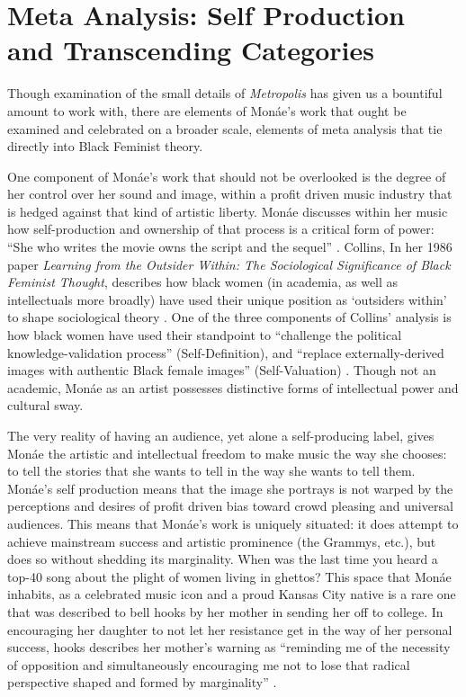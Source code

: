 \documentclass[a4paper, 11pt]{article} %
\begin{document}


\section*{Meta Analysis: Self Production and Transcending Categories}

Though examination of the small details of \emph{Metropolis} has given us a bountiful amount to work with, there are elements of Mon\'ae's work that ought be examined and celebrated on a broader scale, elements of meta analysis that tie directly into Black Feminist theory.

One component of Mon\'ae's work that should not be overlooked is the degree of her control over her sound and image, within a profit driven music industry that is hedged against that kind of artistic liberty.
Mon\'ae discusses within her music how self-production and ownership of that process is a critical form of power: 
``She who writes the movie owns the script and the sequel'' .
Collins, In her 1986 paper \emph{Learning from the Outsider Within: The Sociological Significance of Black Feminist Thought}, describes how black women (in academia, as well as intellectuals more broadly) have used their unique position as `outsiders within' to shape sociological theory .
One of the three components of Collins' analysis is how black women have used their standpoint to ``challenge the political knowledge-validation process'' (Self-Definition), and ``replace externally-derived images with authentic Black female images'' (Self-Valuation) .
Though not an academic, Mon\'ae as an artist possesses distinctive forms of intellectual power and cultural sway.

The very reality of having an audience, yet alone a self-producing label, gives Mon\'ae the artistic and intellectual freedom to make music the way she chooses: to tell the stories that she wants to tell in the way she wants to tell them.
Mon\'ae's self production means that the image she portrays is not warped by the perceptions and desires of profit driven bias toward crowd pleasing and universal audiences.
This means that Mon\'ae's work is uniquely situated: it does attempt to achieve mainstream success and artistic prominence (the Grammys, etc.), but does so without shedding its marginality.
When was the last time you heard a top-40 song about the plight of women living in ghettos?
This space that Mon\'ae inhabits, as a celebrated music icon and a proud Kansas City native is a rare one that was described to bell hooks by her mother in sending her off to college.
In encouraging her daughter to not let her resistance get in the way of her personal success, hooks describes her mother's warning as ``reminding me of the necessity of opposition and simultaneously encouraging me not to lose that radical perspective shaped and formed by marginality'' .
\end{document}
